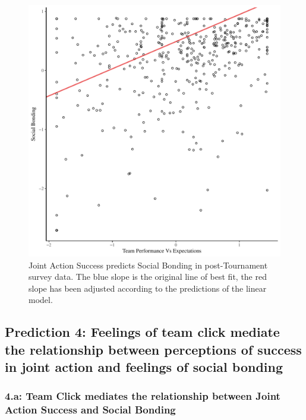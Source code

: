    

   


   \begin{figure}[htbp]
     \centering
   \includegraphics[scale=.5]{images/teamPerfBondOverallModelSlope.pdf}
     \caption{Joint Action Success predicts Social Bonding in post-Tournament survey data. The blue slope is the original line of best fit, the red slope has been adjusted according to the predictions of the linear model.}
     \label{fig:teamPerfBondOverallModelSlope}
   \end{figure}



\subsection{Prediction 4: Feelings of team click mediate the relationship between perceptions of success in joint action and feelings of social bonding}

  \subsubsection{4.a: Team Click mediates the relationship between Joint Action Success and Social Bonding}

